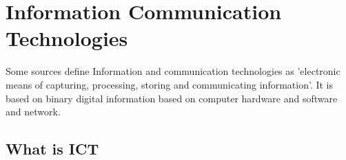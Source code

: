 \documentclass[a4paper,11pt]{article}
\begin{document}
\title{}
\author{Wangzhihui Mei \\ 2019124044 \ 6603385
\\ \\
Central China Normal University \& 
University of Wollongong Joint-Institude}


\date{}

\maketitle
\thispagestyle{empty}
\clearpage


\newpage
\setcounter{page}{1} %


\section{Information Communication Technologies}
Some sources define Information and communication technologies as 'electronic means of capturing, processing, storing and communicating information'\cite{heeks1999information}. It is based on binary digital information based on computer hardware and software and network.

\subsection{What is ICT}


\clearpage


\end{document}
